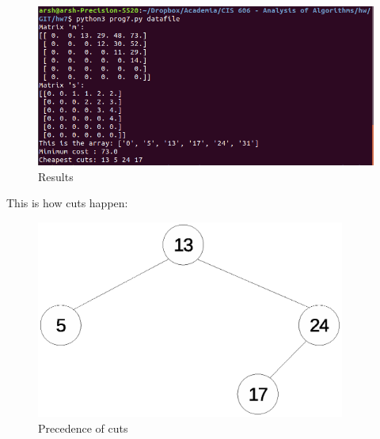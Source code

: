 \documentclass[11pt]{article}
\begin{document}
\begin{enumerate}
	\begin{figure}[h!]
		\centerline{\includegraphics[width=6in]{result.png}}
		\caption{Results}
		\label{fig:result}
	\end{figure}
	 

	This is how cuts happen:
	
	\begin{figure}[h!]
		\centerline{\includegraphics[width=4in]{cuts.eps}}
		\caption{Precedence of cuts}
		\label{fig:cuts}
	\end{figure}

	









	
	
	
	
	
	





































   
\end{enumerate}
\end{document}
